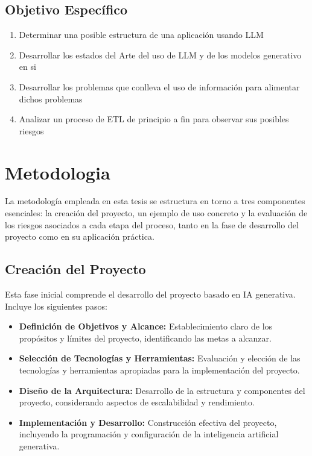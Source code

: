 \subsection{Objetivo Específico}

\begin{enumerate}
\item Determinar una posible estructura de una aplicación usando LLM
\item Desarrollar los estados del Arte del uso de LLM y de los modelos generativo en si
\item Desarrollar los problemas que conlleva el uso de información para alimentar dichos problemas
\item Analizar un proceso de ETL de principio a fin para observar sus posibles riesgos
\end{enumerate}


\section{Metodologia}

La metodología empleada en esta tesis se estructura en torno a tres componentes esenciales: 
la creación del proyecto, un ejemplo de uso concreto y la evaluación de los riesgos asociados 
a cada etapa del proceso, tanto en la fase de desarrollo del proyecto como en su aplicación práctica.
\subsection{Creación del Proyecto}

\noindent Esta fase inicial comprende el desarrollo del proyecto basado en IA generativa. Incluye los siguientes pasos:

\begin{itemize}
    \item \textbf{Definición de Objetivos y Alcance:} Establecimiento claro de los propósitos y límites del proyecto, identificando las metas a alcanzar.
    \item \textbf{Selección de Tecnologías y Herramientas:} Evaluación y elección de las tecnologías y herramientas apropiadas para la implementación del proyecto.
    \item \textbf{Diseño de la Arquitectura:} Desarrollo de la estructura y componentes del proyecto, considerando aspectos de escalabilidad y rendimiento.
    \item \textbf{Implementación y Desarrollo:} Construcción efectiva del proyecto, incluyendo la programación y configuración de la inteligencia artificial generativa.
\end{itemize}
